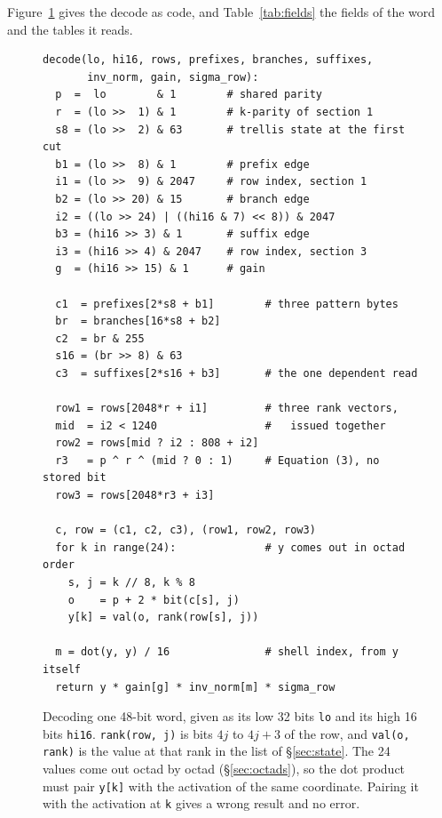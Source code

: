 Figure~\ref{fig:pseudo} gives the decode as code, and Table~\ref{tab:fields}
the fields of the word and the tables it reads.

\begin{figure}[t]
\small
\begin{verbatim}
decode(lo, hi16, rows, prefixes, branches, suffixes,
       inv_norm, gain, sigma_row):
  p  =  lo        & 1        # shared parity
  r  = (lo >>  1) & 1        # k-parity of section 1
  s8 = (lo >>  2) & 63       # trellis state at the first cut
  b1 = (lo >>  8) & 1        # prefix edge
  i1 = (lo >>  9) & 2047     # row index, section 1
  b2 = (lo >> 20) & 15       # branch edge
  i2 = ((lo >> 24) | ((hi16 & 7) << 8)) & 2047
  b3 = (hi16 >> 3) & 1       # suffix edge
  i3 = (hi16 >> 4) & 2047    # row index, section 3
  g  = (hi16 >> 15) & 1      # gain

  c1  = prefixes[2*s8 + b1]        # three pattern bytes
  br  = branches[16*s8 + b2]
  c2  = br & 255
  s16 = (br >> 8) & 63
  c3  = suffixes[2*s16 + b3]       # the one dependent read

  row1 = rows[2048*r + i1]         # three rank vectors,
  mid  = i2 < 1240                 #   issued together
  row2 = rows[mid ? i2 : 808 + i2]
  r3   = p ^ r ^ (mid ? 0 : 1)     # Equation (3), no stored bit
  row3 = rows[2048*r3 + i3]

  c, row = (c1, c2, c3), (row1, row2, row3)
  for k in range(24):              # y comes out in octad order
    s, j = k // 8, k % 8
    o    = p + 2 * bit(c[s], j)
    y[k] = val(o, rank(row[s], j))

  m = dot(y, y) / 16               # shell index, from y itself
  return y * gain[g] * inv_norm[m] * sigma_row
\end{verbatim}
\caption{Decoding one 48-bit word, given as its low 32 bits \texttt{lo} and
its high 16 bits \texttt{hi16}. \texttt{rank(row, j)} is bits $4j$ to $4j+3$
of the row, and \texttt{val(o, rank)} is the value at that rank in the list
of \S\ref{sec:state}. The 24 values come out octad by octad
(\S\ref{sec:octads}), so the dot product must pair \texttt{y[k]} with the
activation of the same coordinate. Pairing it with the activation at
\texttt{k} gives a wrong result and no error.}
\label{fig:pseudo}
\end{figure}

